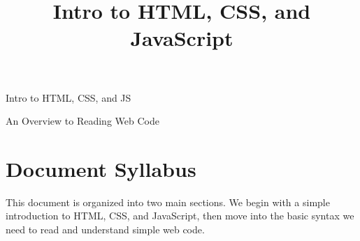 \documentclass{article}
\title{\textcolor{naranja}{\Bitter Intro to HTML, CSS, and JavaScript}}
\begin{document}
\begin{titlepage}
  \centering
  \vspace*{\fill}

  {\Huge\Bitter\textcolor{naranja}{Intro to HTML, CSS, and JS}\par}

  \vspace{0.4cm}

  {\Large\textcolor{morado}{An Overview to Reading Web Code}\par}

  \vspace*{\fill}
\end{titlepage}

\vspace{-0.5cm}

\section*{\Bitter\textcolor{naranja}{Document Syllabus}}

This document is organized into two main sections. We begin with a simple introduction to HTML, CSS, and JavaScript, then move into the basic syntax we need to read and understand simple web code.

\vspace{0.25cm}
\end{document}
